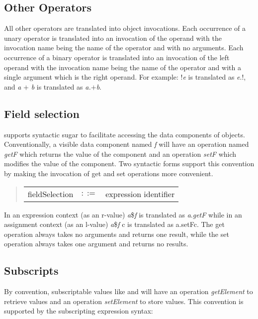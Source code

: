 \subsection{Other Operators}
All other operators are translated into object invocations.  Each occurrence
of a unary operator is
translated into an invocation of the operand with the invocation name being
the name of the operator and with no arguments.  Each occurrence of a binary
operator is translated into an invocation of the left operand with the
invocation name being the name of the operator and with a single argument
which is the right operand.  For example: {$!${\it e}} is translated as {{\it
e\/}.$!$}, and {{\it a\/} $+$ {\it b\/}} is translated as {{\it {\it a\/}.$+$\LB{}b\/}\RB}.


\subsection{Field selection}
\emd{} supports syntactic sugar to facilitate accessing the data components
of objects.  Conventionally, a visible data component named {\it f}
will have an operation named {\it getF} which returns the value of the
component and an operation {\it setF} which modifies the value of the
component.  Two syntactic forms support this convention by making the
invocation of get and set operations more convenient.

\begin{quote}\it\begin{tabular}{lcl}
  fieldSelection & $::=$ & expression \terminal{\$} identifier \\
\end{tabular}\end{quote}

In an expression context (as an r-value) {{\it a}\${\it f}} is translated as
{{\it a\/}.{\it getF}} while in an assignment context (as an l-value) {{\it
a}\${\it f} \assign{} c}  is translated as {a.setF\/\LB{}c\/\RB{}}.  The get operation
always takes no arguments and returns one result, while the set operation
always takes one argument and returns no results.
\subsection{Subscripts}
By convention, subscriptable values like  and  will
have an operation {\it getElement} to retrieve values and an operation {\it
setElement} to store values.  This convention is supported by the
subscripting expression syntax:

